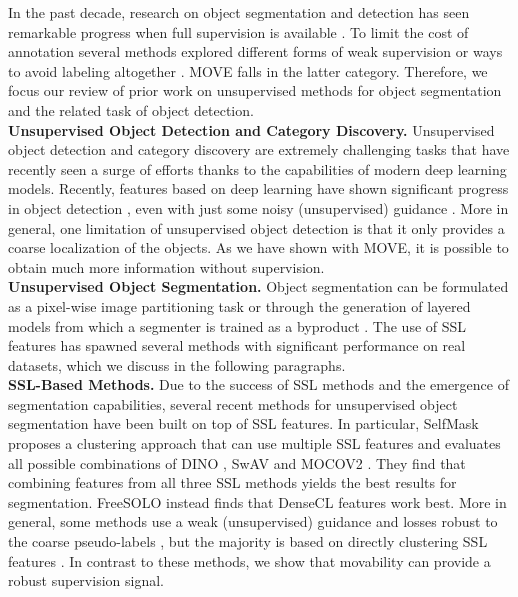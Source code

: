 \documentclass{article}
\newcommand\methodname{MOVE\xspace}
\begin{document}
In the past decade, research on object segmentation and detection has seen remarkable progress when full supervision is available \cite{He2017MaskR,hu2018learning,carion2020end}.
To limit the cost of annotation several methods explored different forms of weak supervision
\cite{Khoreva_2017_CVPR,zhou2019objects}
or ways to avoid labeling altogether 
\cite{Ji2018,kanezaki2018,Ostyakov2018,Remez_2018_ECCV}.
\methodname falls in the latter category. Therefore, we focus our review of prior work on unsupervised methods for object segmentation and the related task of object detection.\\
\noindent\textbf{Unsupervised Object Detection and Category Discovery.} 
Unsupervised object detection and category discovery are extremely challenging tasks that have recently seen a surge of efforts \cite{bar2021detreg,rambhatla2021pursuit,zheng2022towards}
thanks to the capabilities of modern deep learning models.
Recently, features based on deep learning have shown significant progress in object detection \cite{bar2021detreg}, even with just some noisy (unsupervised) guidance \cite{uijlings2013selective}. 
More in general, one limitation of unsupervised object detection is that it only provides a coarse localization of the objects. As we have shown with \methodname, it is possible to obtain much more information without supervision.\\ \noindent\textbf{Unsupervised Object Segmentation.} 
Object segmentation can be formulated as a pixel-wise image partitioning task \cite{Ji2018,ouali2020autoregressive,Xia2017WNetAD,kanezaki2018}
or through the generation of layered models from which a segmenter is trained as a byproduct \cite{wang2022freesolo,Zhang_2018_CVPR,nguyen2019deepusps,burgess2019monet}.
The use of SSL features has spawned several methods with significant performance on real datasets, which we discuss in the following paragraphs.\\
\noindent\textbf{SSL-Based Methods.} 
Due to the success of SSL methods and the emergence of segmentation capabilities, several recent methods for unsupervised object segmentation have been built on top of SSL features.
In particular, SelfMask \cite{Shin2022selfmask} proposes a clustering approach that can use multiple SSL features and evaluates all possible combinations of DINO \cite{caron2021emerging}, SwAV \cite{caron2020unsupervised} and MOCOV2 \cite{he2020momentum}. They find that combining features from all three SSL methods yields the best results for segmentation. FreeSOLO \cite{wang2022freesolo} instead finds that DenseCL features \cite{wang2021dense} work best. More in general, some methods use a weak (unsupervised) guidance and losses robust to the coarse pseudo-labels \cite{wang2022freesolo}, but the majority is based on directly clustering SSL features \cite{melas2022,amir2021deep,yin2021transfgu,ziegler2022leopart,LOST,wang2022self}. In contrast to these methods, we show that movability can provide a robust supervision signal.\\
\end{document}
